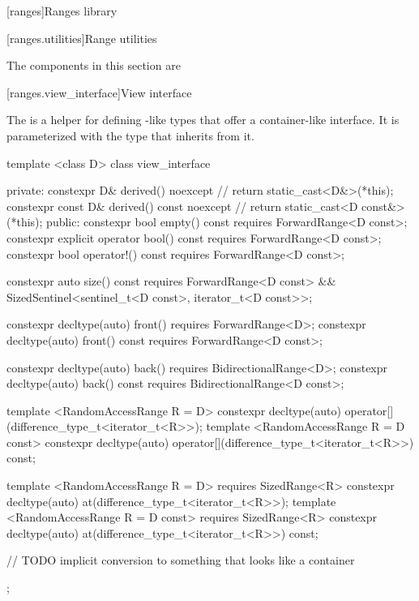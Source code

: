 
\setcounter{chapter}{9}
[ranges]{Ranges library}


\setcounter{section}{6}
[ranges.utilities]{Range utilities}

\pnum
The components in this section are 

[ranges.view_interface]{View interface}

\pnum
The  is a helper for defining -like types that offer a
container-like interface. It is parameterized with the type that inherits from it.

%
\begin{codeblock}
template <class D>
class view_interface {
private:
  constexpr D& derived() noexcept { // \expos
    return static_cast<D&>(*this);
  }
  constexpr const D& derived() const noexcept { // \expos
    return static_cast<D const&>(*this);
  }
public:
  constexpr bool empty() const requires ForwardRange<D const>;
  constexpr explicit operator bool() const requires ForwardRange<D const>;
  constexpr bool operator!() const requires ForwardRange<D const>;

  constexpr auto size() const requires ForwardRange<D const> &&
    SizedSentinel<sentinel_t<D const>, iterator_t<D const>>;

  constexpr decltype(auto) front() requires ForwardRange<D>;
  constexpr decltype(auto) front() const requires ForwardRange<D const>;

  constexpr decltype(auto) back() requires BidirectionalRange<D>;
  constexpr decltype(auto) back() const requires BidirectionalRange<D const>;

  template <RandomAccessRange R = D>
  constexpr decltype(auto) operator[](difference_type_t<iterator_t<R>>);
  template <RandomAccessRange R = D const>
  constexpr decltype(auto) operator[](difference_type_t<iterator_t<R>>) const;

  template <RandomAccessRange R = D>
    requires SizedRange<R>
  constexpr decltype(auto) at(difference_type_t<iterator_t<R>>);
  template <RandomAccessRange R = D const>
    requires SizedRange<R>
  constexpr decltype(auto) at(difference_type_t<iterator_t<R>>) const;

  // TODO implicit conversion to something that looks like a container
};
\end{codeblock}

